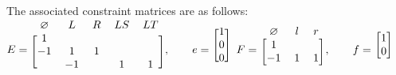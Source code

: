 \documentclass[11pt]{tufte-handout}
\theoremstyle{plain}
\theoremstyle{definition}
\theoremstyle{remark}
\begin{document}
The associated constraint matrices are as follows: \\[12pt]

$ E = \begin{blockarray}{c c c c c}
            \varnothing & L & R & LS & LT \\
            \begin{block}{[c c c c c]}
                1 &    &   &   & \\
               -1 & 1  & 1 &   & \\
                  & -1 &   & 1 & 1 \\
            \end{block}
            \end{blockarray},\quad\quad
    e = \begin{blockarray}{[c]}
                1 \\
                0 \\
                0 \\
            \end{blockarray}
$
\newline
$
    F = \begin{blockarray}{c c c}
            \varnothing & l & r \\
            \begin{block}{[c c c]}
                1 &    &    \\
               -1 & 1  & 1 \\
            \end{block}
            \end{blockarray}, \quad\quad
    f = \begin{blockarray}{[c]}
                1 \\
                0 \\
            \end{blockarray}
$
\newpage
\end{document}
